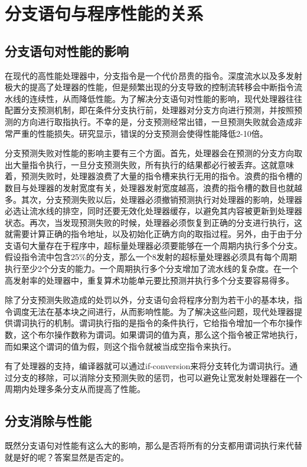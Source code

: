 \section{分支语句与程序性能的关系}

\subsection{分支语句对性能的影响}

在现代的高性能处理器中，分支指令是一个代价昂贵的指令\cite{Mahlke1994}。深度流水以及多发射极大的提高了处理器的性能，但是频繁出现的分支导致的控制流转移会中断指令流水线的连续性，从而降低性能。为了解决分支语句对性能的影响，现代处理器往往配置分支预测机制，即在条件分支执行前，处理器对分支方向进行预测，并按照预测的方向进行取指执行。不幸的是，分支预测经常出错，一旦预测失败就会造成非常严重的性能损失。研究显示，错误的分支预测会使得性能降低2-10倍\cite{Smith1989}\cite{Wall1991}\cite{1991}。

分支预测失败对性能的影响主要有三个方面。首先，处理器会在预测的分支方向取出大量指令执行，一旦分支预测失败，所有执行的结果都必行被丢弃。这就意味着，预测失败时，处理器浪费了大量的指令槽来执行无用的指令。浪费的指令槽的数目与处理器的发射宽度有关，处理器发射宽度越高，浪费的指令槽的数目也就越多。其次，分支预测失败以后，处理器必须撤销预测执行对处理器的影响，处理器必选让流水线的排空，同时还要无效化处理器缓存，以避免其内容被更新到处理器状态。再次，当发现预测失败的时候，处理器必须恢复到正确的分支进行执行，这就需要计算正确的指令地址，以及初始化正确方向的取指过程。另外，由于由于分支语句大量存在于程序中，超标量处理器必须要能够在一个周期内执行多个分支。假设指令流中包含25\%的分支，那么一个8发射的超标量处理器必须具有每个周期执行至少2个分支的能力。一个周期执行多个分支增加了流水线的复杂度。在一个高发射率的处理器中，重复算术功能单元要比预测并执行多个分支要容易得多。

除了分支预测失败造成的处罚以外，分支语句会将程序分割为若干小的基本块，指令调度无法在基本块之间进行，从而影响性能。为了解决这些问题，现代处理器提供谓词执行的机制。谓词执行指的是指令的条件执行，它给指令增加一个布尔操作数，这个布尔操作数称为谓词。如果谓词的值为真，那么这个指令被正常地执行，而如果这个谓词的值为假，则这个指令就被当成空指令来执行。

有了处理器的支持，编译器就可以通过if-conversion来将分支转化为谓词执行。通过分支的移除，可以消除分支预测失败的惩罚，也可以避免让宽发射处理器在一个周期内处理多条分支从而提高了性能。

\subsection{分支消除与性能}\label{harm_performance}

既然分支语句对性能有这么大的影响，那么是否将所有的分支都用谓词执行来代替就是好的呢？答案显然是否定的。